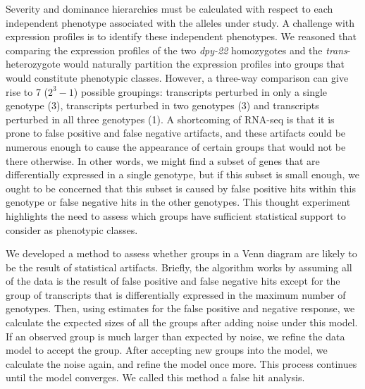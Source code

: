 \documentclass[9pt,twocolumn,twoside]{gsajnl}
\newcommand{\gene}[1]{\mbox{\emph{#1}}}
\newcommand{\dpy}[1]{\gene{dpy-22#1}}
\begin{document}
Severity and dominance hierarchies must be calculated with respect to each
independent phenotype associated with the alleles under study. A challenge with
expression profiles is to identify these independent phenotypes. We reasoned
that comparing the expression profiles of the two \dpy{} homozygotes and the
\emph{trans}-heterozygote would naturally partition the expression profiles into
groups that would constitute phenotypic classes. However, a three-way comparison
can give rise to 7 ($2^3-1$) possible groupings: transcripts perturbed in only a
single genotype (3), transcripts perturbed in two genotypes (3) and transcripts
perturbed in all three genotypes (1). A shortcoming of RNA-seq is that it is
prone to false positive and false negative artifacts, and these artifacts could
be numerous enough to cause the appearance of certain groups that would not
be there otherwise. In other words, we might find a subset of genes that are
differentially expressed in a single genotype, but if this subset is small
enough, we ought to be concerned that this subset is caused by false positive
hits within this genotype or false negative hits in the other genotypes. This
thought experiment highlights the need to assess which groups have sufficient
statistical support to consider as phenotypic classes.

We developed a method to assess whether groups in a Venn diagram are likely to
be the result of statistical artifacts. Briefly, the algorithm works by assuming
all of the data is the result of false positive and false negative hits except
for the group of transcripts that is differentially expressed in the maximum
number of genotypes. Then, using estimates for the false positive and negative
response, we calculate the expected sizes of all the groups after adding noise
under this model. If an observed group is much larger than expected by noise, we
refine the data model to accept the group. After accepting new groups into the
model, we calculate the noise again, and refine the model once more. This
process continues until the model converges. We called this method a false hit
analysis.
\end{document}
